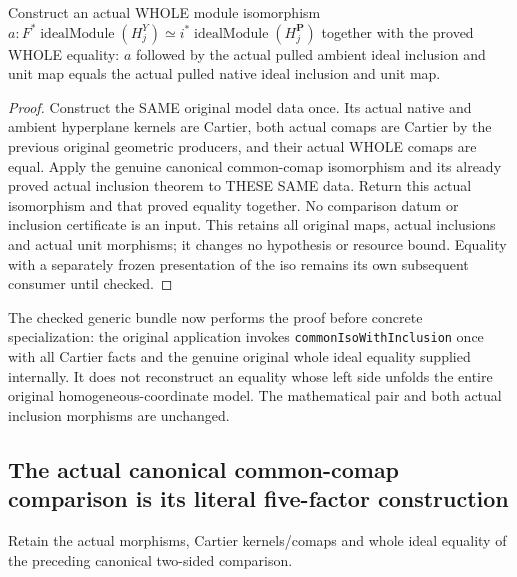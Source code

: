 \begin{definition}
\label{def:seven-original-native-coordinate-ideal-iso-with-inclusion-route}
\leanok
{}
Construct an actual WHOLE module isomorphism
$a:F^*\operatorname{idealModule}(H_j^Y)\simeq
 i^*\operatorname{idealModule}(H_j^{\mathbf P})$ together with the proved
WHOLE equality: $a$ followed by the actual pulled ambient ideal inclusion
and unit map equals the actual pulled native ideal inclusion and unit map.
\end{definition}
\begin{proof}
Construct the SAME original model data once. Its actual native and ambient
hyperplane kernels are Cartier, both actual comaps are Cartier by the
previous original geometric producers, and their actual WHOLE comaps are
equal. Apply the genuine canonical common-comap isomorphism and its
already proved actual inclusion theorem to THESE SAME data. Return this
actual isomorphism and that proved equality together. No comparison datum
or inclusion certificate is an input. This retains all original maps,
actual inclusions and actual unit morphisms; it changes no hypothesis or
resource bound. Equality with a separately frozen presentation of the iso
remains its own subsequent consumer until checked.
\end{proof}

The checked generic bundle now performs the proof before concrete specialization:
the original application invokes \texttt{commonIsoWithInclusion} once with
all Cartier facts and the genuine original whole ideal equality supplied
internally. It does not reconstruct an equality whose left side unfolds
the entire original homogeneous-coordinate model. The mathematical pair
and both actual inclusion morphisms are unchanged.

\subsection{The actual canonical common-comap comparison is its literal five-factor construction}
Retain the actual morphisms, Cartier kernels/comaps and whole ideal equality
of the preceding canonical two-sided comparison.

